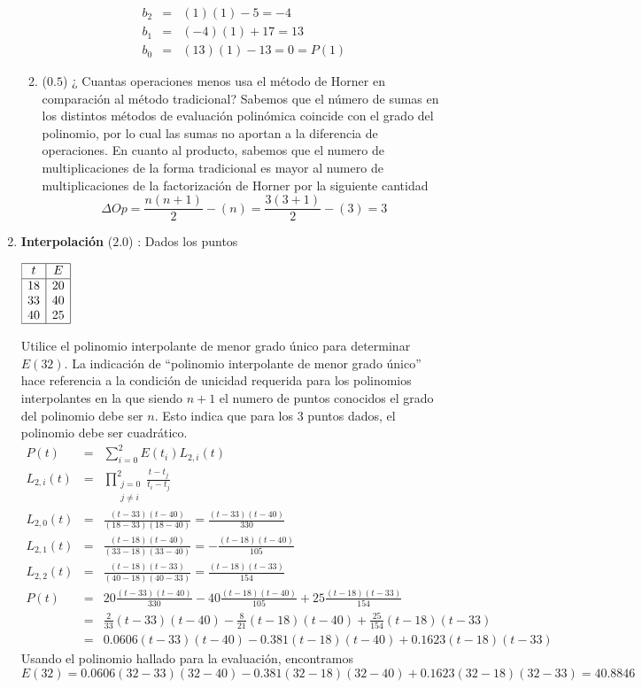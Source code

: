 \documentclass[12pt]{article}
\begin{document}
\begin{enumerate}[leftmargin=*,widest=9]
\begin{enumerate}[label=\alph*]
\begin{eqnarray*}
b_2 & = & (1)(1) - 5 = -4\\
b_1 & = & (-4)(1) + 17 = 13\\
b_0 & = & (13)(1) - 13 = 0 = P(1)
\end{eqnarray*}
\item ($0.5$) ¿ Cuantas operaciones menos usa el método de Horner en comparación al método tradicional?
Sabemos que el número de sumas en los distintos métodos de evaluación polinómica coincide con el grado del polinomio, por lo cual las sumas no aportan a la diferencia de operaciones. En cuanto al producto, sabemos que el numero de multiplicaciones de la forma tradicional es mayor al numero de multiplicaciones de la factorización de Horner por la siguiente cantidad
\[ \Delta Op = \frac{n(n+1)}{2} - (n) = \frac{3(3+1)}{2} - (3) = 3 \]
    \end{enumerate}
    \item \textbf{Interpolación} ($2.0$) : Dados los puntos
    \begin{center}
    \(
    \begin{array}{|c|c|}
    \hline
    t & E \\
    \hline
    18 & 20 \\
    33 & 40\\
    40 & 25\\
    \hline
    \end{array}
    \)
    \end{center}
    Utilice el polinomio interpolante de menor grado único para determinar \(E(32)\).
    La indicación de ``polinomio interpolante de menor grado único'' hace referencia a la condición de unicidad requerida para los polinomios interpolantes en la que siendo \(n+1\) el numero de puntos conocidos el grado del polinomio debe ser \(n\). Esto indica que para los 3 puntos dados, el polinomio debe ser cuadrático.
    \begin{eqnarray*}
    P(t) & = & \sum_{i=0}^2 E(t_i) L_{2, i}(t) \\
    L_{2, i}(t) & = & \prod_{\substack{j=0 \\ j \neq i}}^{2} \frac{t-t_j}{t_i - t_j}\\
    L_{2, 0}(t) & = & \frac{(t-33)(t-40)}{(18-33)(18-40)} = \frac{(t-33)(t-40)}{330}\\
    L_{2, 1}(t) & = & \frac{(t-18)(t-40)}{(33-18)(33-40)} = -\frac{(t-18)(t-40)}{105}\\
    L_{2, 2}(t) & = & \frac{(t-18)(t-33)}{(40-18)(40-33)} = \frac{(t-18)(t-33)}{154}\\
    P(t) & = & 20 \frac{(t-33)(t-40)}{330} - 40 \frac{(t-18)(t-40)}{105} + 25 \frac{(t-18)(t-33)}{154}\\
    & = & \frac{2}{33}(t-33)(t-40) - \frac{8}{21}(t-18)(t-40) +  \frac{25}{154}(t-18)(t-33)\\
    & = & 0.0606(t-33)(t-40) - 0.381(t-18)(t-40) +  0.1623(t-18)(t-33)
    \end{eqnarray*}
    Usando el polinomio hallado para la evaluación, encontramos
    \[ E(32) = 0.0606(32-33)(32-40) - 0.381(32-18)(32-40) +  0.1623(32-18)(32-33) = 40.8846 \]
  \end{enumerate}
\end{document}
